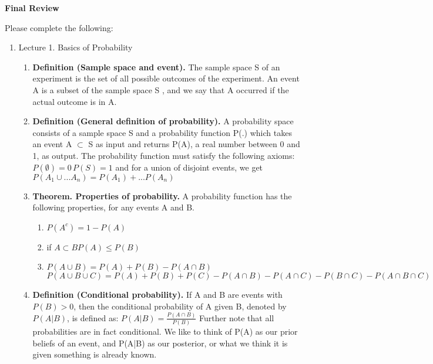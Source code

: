 \documentclass[11pt]{article}
\begin{document}
\begin{title}
	{\Large\bf Final Review}
\end{title}

\author{\bf Alexander Van Roijen}

\maketitle

\newpage
Please complete the following:
\begin{enumerate}
\item Lecture 1. Basics of Probability
\begin{enumerate}
	\item \textbf{Definition (Sample space and event).} The sample space S of an experiment is the set of all possible outcomes
	of the experiment. An event A is a subset of the sample space S , and we say that A occurred if the
	actual outcome is in A.
	\item \textbf{Definition (General definition of probability).} A probability space consists of a sample space S and a
	probability function P(.) which takes an event A $\subset$ S as input and returns P(A), a real number between 0
	and 1, as output. The probability function must satisfy the following axioms: $P(\emptyset) = 0 \, P(S)=1$ and for a union of disjoint events, we get $P(A_1\cup...A_n) = P(A_1)+...P(A_n)$ 
	\item \textbf{Theorem. Properties of probability.} A probability function has the following properties, for any events A
	and B.
	\begin{enumerate}
		\item $P(A^c)=1-P(A)$
		\item if $A\subset B P(A)\le P(B)$
		\item $P(A\cup B) = P(A)+P(B) - P(A\cap B)$ \\
		$P(A\cup B \cup C) = P(A) + P(B) + P(C) - P(A\cap B) - P(A \cap C) - P(B \cap C) - P(A \cap B \cap C)$
	\end{enumerate}
	\item\textbf{ Definition (Conditional probability).} If A and B are events with $P(B) > 0$, then the conditional probability
	of A given B, denoted by $P(A|B)$, is defined as:
	$P(A | B) =\frac{
	P(A \cap B)}
	{P(B)}$
	Further note that all probabilities are in fact conditional. We like to think of P(A) as our prior beliefs of an event, and P(A|B) as our posterior, or what we think it is given something is already known.

\end{enumerate}
\end{enumerate}
\end{document}
